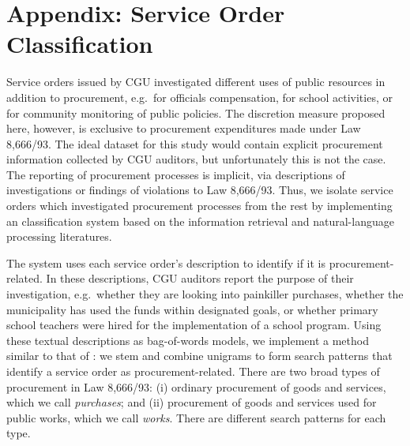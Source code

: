 \documentclass[11pt]{article}
\begin{document}
\setlength\bibsep{0pt}



\clearpage







\clearpage

\appendix
\section{Appendix: Service Order Classification} \label{sec:appendixA}

Service orders issued by CGU investigated different uses of public resources in addition to procurement, e.g.~for officials compensation, for school activities, or for community monitoring of public policies. The discretion measure proposed here, however, is exclusive to procurement expenditures made under Law 8,666/93. The ideal dataset for this study would contain explicit procurement information collected by CGU auditors, but unfortunately this is not the case. The reporting of procurement processes is implicit, via descriptions of investigations or findings of violations to Law 8,666/93. Thus, we isolate service orders which investigated procurement processes from the rest by implementing an classification system based on the information retrieval and natural-language processing literatures.

The system uses each service order's description to identify if it is procurement-related. In these descriptions, CGU auditors report the purpose of their investigation, e.g.~whether they are looking into painkiller purchases, whether the municipality has used the funds within designated goals, or whether primary school teachers were hired for the implementation of a school program. Using these textual descriptions as bag-of-words models, we implement a method similar to that of \citet{HopkinsMethodAutomatedNonparametric2009}: we stem and combine unigrams to form search patterns that identify a service order as procurement-related. There are two broad types of procurement in Law 8,666/93: (i) ordinary procurement of goods and services, which we call \emph{purchases}; and (ii) procurement of goods and services used for public works, which we call \emph{works}. There are different search patterns for each type.
\end{document}

